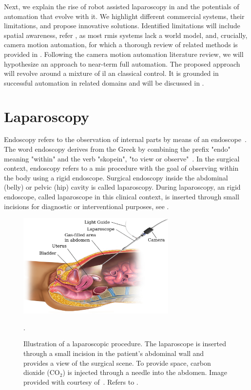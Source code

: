 Next, we explain the rise of robot assisted laparoscopy in  and the potentials of automation that evolve with it. We highlight different commercial systems, their limitations, and propose innovative solutions. Identified limitations will include spatial awareness, refer , as most \gls{rmis} systems lack a world model, and, crucially, camera motion automation, for which a thorough review of related methods is provided in . Following the camera motion automation literature review, we will hypothesize an approach to near-term full automation. The proposed approach will revolve around a mixture of \gls{il} an classical control. It is grounded in successful automation in related domains and will be discussed in .

\section{Laparoscopy}
\label{in:sec:laparoscopy}
Endoscopy refers to the observation of internal parts by means of an endoscope~\cite{oedendoscopy}. The word endoscopy derives from the Greek by combining the prefix "endo" meaning "within" and the verb "skopein", "to view or observe"~\cite{majumdar1993short}. In the surgical context, endoscopy refers to a \gls{mis} procedure with the goal of observing within the body using a rigid endoscope. Surgical endoscopy inside the abdominal (belly) or pelvic (hip) cavity is called laparoscopy. During laparoscopy, an rigid endoscope, called laparoscope in this clinical context, is inserted through small incisions for diagnostic or interventional purposes, see .
\begin{figure}[tb]
    \centering
    \includegraphics[width=0.7\textwidth]{introduction/img/laparoscopy.jpg}
    \caption{Illustration of a laparoscopic procedure. The laparoscope is inserted through a small incision in the patient's abdominal wall and provides a view of the surgical scene. To provide space, carbon dioxide ($\text{CO}_2$) is injected through a needle into the abdomen. Image provided with courtesy of~\cite{blausen2014laparoscopy}. Refers to .}
    \label{in:fig:laparoscopy}.
\end{figure}

